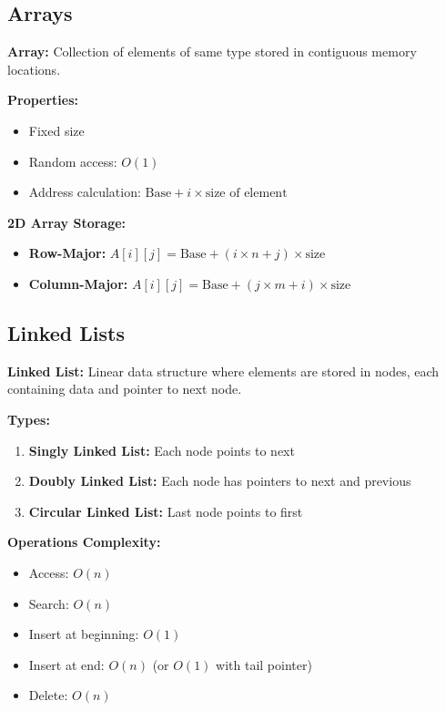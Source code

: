 \documentclass[11pt,a4paper]{article}
\begin{document}
\subsection{Arrays}

\begin{defbox}
\textbf{Array:} Collection of elements of same type stored in contiguous memory locations.
\end{defbox}

\textbf{Properties:}
\begin{itemize}
    \item Fixed size
    \item Random access: $O(1)$
    \item Address calculation: $\text{Base} + i \times \text{size of element}$
\end{itemize}

\textbf{2D Array Storage:}
\begin{itemize}
    \item \textbf{Row-Major:} $A[i][j] = \text{Base} + (i \times n + j) \times \text{size}$
    \item \textbf{Column-Major:} $A[i][j] = \text{Base} + (j \times m + i) \times \text{size}$
\end{itemize}

\subsection{Linked Lists}

\begin{defbox}
\textbf{Linked List:} Linear data structure where elements are stored in nodes, each containing data and pointer to next node.
\end{defbox}

\textbf{Types:}
\begin{enumerate}
    \item \textbf{Singly Linked List:} Each node points to next
    \item \textbf{Doubly Linked List:} Each node has pointers to next and previous
    \item \textbf{Circular Linked List:} Last node points to first
\end{enumerate}

\textbf{Operations Complexity:}
\begin{itemize}
    \item Access: $O(n)$
    \item Search: $O(n)$
    \item Insert at beginning: $O(1)$
    \item Insert at end: $O(n)$ (or $O(1)$ with tail pointer)
    \item Delete: $O(n)$
\end{itemize}
\end{document}
